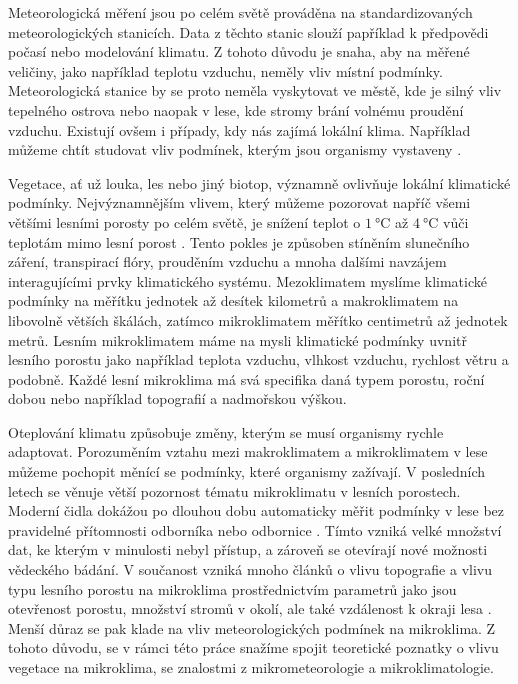 Meteorologická měření jsou po celém světě prováděna na standardizovaných meteorologických stanicích. Data z těchto stanic slouží papříklad k předpovědi počasí nebo modelování klimatu. Z tohoto důvodu je snaha, aby na měřené veličiny, jako například teplotu vzduchu, neměly vliv místní podmínky. Meteorologická stanice by se proto neměla vyskytovat ve městě, kde je silný vliv tepelného ostrova nebo naopak v lese, kde stromy brání volnému proudění vzduchu. Existují ovšem i případy, kdy nás zajímá lokální klima. Například můžeme chtít studovat vliv podmínek, kterým jsou organismy vystaveny \parencite{ZellwegerFlorian2019Sdou}.

Vegetace, ať už louka, les nebo jiný biotop, významně ovlivňuje lokální klimatické podmínky. Nejvýznamnějším vlivem, který můžeme pozorovat napříč všemi většími lesními porosty po celém světě, je snížení teplot o $\SI{1}{\celsius}$ až $\SI{4}{\celsius}$ vůči teplotám mimo lesní porost \parencite{ZellwegerFlorian2019Sdou}. Tento pokles je způsoben stíněním slunečního záření, transpirací flóry, prouděním vzduchu a mnoha dalšími navzájem interagujícími prvky klimatického systému. Mezoklimatem myslíme klimatické podmínky na měřítku jednotek až desítek kilometrů a makroklimatem na libovolně větších škálách, zatímco mikroklimatem měřítko centimetrů až jednotek metrů. Lesním mikroklimatem máme na mysli klimatické podmínky uvnitř lesního porostu jako například teplota vzduchu, vlhkost vzduchu, rychlost větru a podobně. Každé lesní mikroklima má svá specifika daná typem porostu, roční dobou nebo například topografií a nadmořskou výškou.

Oteplování klimatu způsobuje změny, kterým se musí organismy rychle adaptovat. Porozuměním vztahu mezi makroklimatem a mikroklimatem v lese můžeme pochopit měnící se podmínky, které organismy zažívají. V posledních letech se věnuje větší pozornost tématu mikroklimatu v lesních porostech. Moderní čidla dokážou po dlouhou dobu automaticky měřit podmínky v lese bez pravidelné přítomnosti odborníka nebo odbornice \parencite{WildJan2019Caer}. Tímto vzniká velké množství dat, ke kterým v minulosti nebyl přístup, a zároveň se otevírají nové možnosti vědeckého bádání. V součanost vzniká mnoho článků o vlivu topografie a vlivu typu lesního porostu na mikroklima prostřednictvím parametrů jako jsou otevřenost porostu, množství stromů v okolí, ale také vzdálenost k okraji lesa \parencite{ZellwegerFlorian2019Sdou, predictingforestmicroclimate, snow_deFrenneForestMicroclimates, LindenmayerDavid2022Sard}. Menší důraz se pak klade na vliv meteorologických podmínek na mikroklima. Z tohoto důvodu, se v rámci této práce snažíme spojit teoretické poznatky o vlivu vegetace na mikroklima, se znalostmi z mikrometeorologie a mikroklimatologie.


